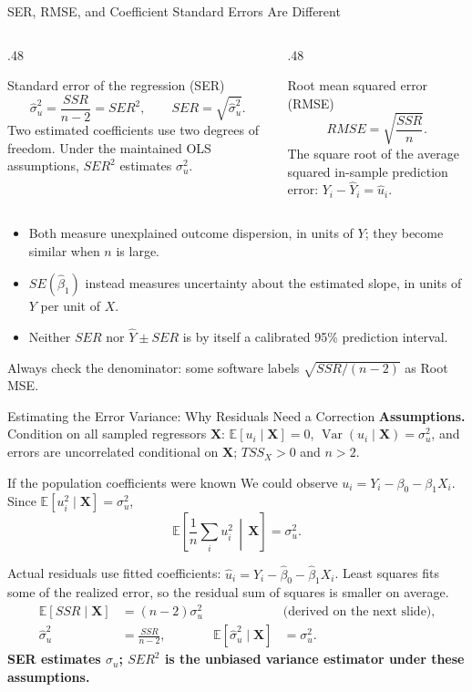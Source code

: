 \documentclass[10pt,aspectratio=169]{beamer}
\newcommand{\E}{\mathbb{E}}
\newcommand{\Var}{\operatorname{Var}}
\begin{document}
\begin{frame}{SER, RMSE, and Coefficient Standard Errors Are Different}
\small
\begin{columns}[T]
\begin{column}{.48\textwidth}
\begin{block}{Standard error of the regression (SER)}
\[
\widehat\sigma_u^2=\frac{SSR}{n-2}=SER^2,
\qquad SER=\sqrt{\widehat\sigma_u^2}.
\]
Two estimated coefficients use two degrees of freedom. Under the maintained OLS assumptions, $SER^2$ estimates $\sigma_u^2$.
\end{block}
\end{column}
\begin{column}{.48\textwidth}
\begin{block}{Root mean squared error (RMSE)}
\[
RMSE=\sqrt{\frac{SSR}{n}}.
\]
The square root of the average squared in-sample prediction error:
$Y_i-\widehat Y_i=\widehat u_i$.
\end{block}
\end{column}
\end{columns}
\medskip
\begin{itemize}
\item Both measure unexplained outcome dispersion, in units of $Y$; they become similar when $n$ is large.
\item $SE(\widehat\beta_1)$ instead measures uncertainty about the estimated slope, in units of $Y$ per unit of $X$.
\item Neither $SER$ nor $\widehat Y\pm SER$ is by itself a calibrated 95\% prediction interval.
\end{itemize}
Always check the denominator: some software labels $\sqrt{SSR/(n-2)}$ as Root MSE.
\end{frame}

\begin{frame}{Estimating the Error Variance: Why Residuals Need a Correction}
\small
\textbf{Assumptions.} Condition on all sampled regressors $\mathbf X$:
$\E[u_i\mid\mathbf X]=0$, $\Var(u_i\mid\mathbf X)=\sigma_u^2$, and errors are
uncorrelated conditional on $\mathbf X$; $TSS_X>0$ and $n>2$.
\begin{block}{If the population coefficients were known}
We could observe $u_i=Y_i-\beta_0-\beta_1X_i$. Since
$\E[u_i^2\mid\mathbf X]=\sigma_u^2$,
\[
\E\!\left[\frac1n\sum_i u_i^2\,\middle|\,\mathbf X\right]=\sigma_u^2.
\]
\end{block}
Actual residuals use fitted coefficients:
$\widehat u_i=Y_i-\widehat\beta_0-\widehat\beta_1X_i$.
Least squares fits some of the realized error, so the residual sum of squares is smaller on average.
\begin{align*}
\E[SSR\mid\mathbf X]&=(n-2)\sigma_u^2
&&\text{(derived on the next slide)},\\
\widehat\sigma_u^2&=\frac{SSR}{n-2},
&\E[\widehat\sigma_u^2\mid\mathbf X]&=\sigma_u^2.
\end{align*}
\textbf{SER estimates $\sigma_u$; $SER^2$ is the unbiased variance estimator under these assumptions.}
\end{frame}
\end{document}

